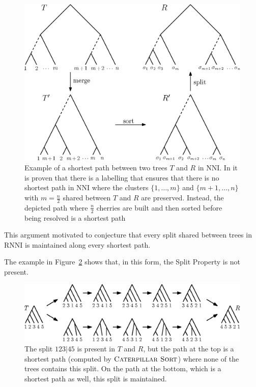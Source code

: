 \documentclass{amsart}
\newcommand{\nni}{\mathrm{NNI}}
\newcommand{\rnni}{\mathrm{RNNI}}
\newcommand{\csort}{\textsc{Caterpillar Sort}}
\begin{document}
\begin{figure}[H]
\centering
\includegraphics[width=.8\textwidth]{NNI_NP_proof}
\vspace{12pt}
\caption{Example of a shortest path between two trees $T$ and $R$ in $\nni$.
In \autocite{Li1996-zw} it is proven that there is a labelling that ensures that there is no shortest path in $\nni$ where the clusters $\{1, \ldots, m\}$ and $\{m+1, \ldots, n\}$ with $m = \frac{n}{2}$ shared between $T$ and $R$ are preserved.
Instead, the depicted path where $\frac{n}{2}$ cherries are built and then sorted before being resolved is a shortest path}
\label{fig:NNI_NP_proof}
\end{figure}

This argument motivated \textcite[Conjecture~9]{Gavryushkin2018-ol} to conjecture that every split shared between trees in $\rnni$ is maintained along every shortest path.

The example in Figure~\ref{fig:splitthm_counterexample} shows that, in this form, the Split Property is not present.

\begin{figure}[H]
\centering
\includegraphics[width=\textwidth]{splitthm_counterexample}
\vspace{12pt}
\caption{The split $123|45$ is present in $T$ and $R$, but the path at the top is a shortest path (computed by $\csort$) where none of the trees contains this split.
On the path at the bottom, which is a shortest path as well, this split is maintained.}
\label{fig:splitthm_counterexample}
\end{figure}
\end{document}
